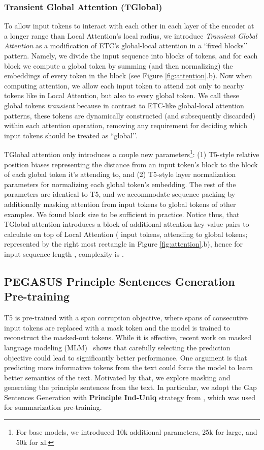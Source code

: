 \documentclass[11pt]{article}
\begin{document}
\subsubsection{Transient Global Attention (TGlobal)}
To allow input tokens to interact with each other in each layer of the encoder at a longer range than Local Attention’s local radius, we introduce {\em Transient Global Attention} as a modification of ETC’s global-local attention in a ``fixed blocks’’ pattern.  Namely, we divide the input sequence into blocks of  tokens, and for each block we compute a global token by summing (and then normalizing) the embeddings of every token in the block (see Figure \ref{fig:attention}.b).  Now when computing attention, we allow each input token to attend not only to nearby tokens like in Local Attention, but also to every global token. We call these global tokens \emph{transient} because in contrast to ETC-like global-local attention patterns, these tokens are dynamically constructed (and subsequently discarded) within each attention operation, removing any requirement for deciding which input tokens should be treated as ``global’’.

TGlobal attention only introduces a couple new parameters\footnote{For base models, we introduced 10k additional parameters, 25k for large, and 50k for xl.}: (1) T5-style relative position biases representing the distance from an input token’s block to the block of each global token it’s attending to, and (2) T5-style layer normalization parameters for normalizing each global token’s embedding.  The rest of the parameters are identical to T5, and we accommodate sequence packing by additionally masking attention from input tokens to global tokens of other examples.  We found block size  to be sufficient in practice. Notice thus, that TGlobal attention introduces a block of  additional attention key-value pairs to calculate on top of Local Attention ( input tokens, attending to  global tokens; represented by the right most rectangle in Figure \ref{fig:attention}.b), hence
for input sequence length , complexity is .







\subsection{PEGASUS Principle Sentences Generation Pre-training}
\label{sec:pegasus}
T5 is pre-trained with a span corruption objective, where spans of consecutive input tokens are replaced with a mask token and the model is trained to reconstruct the masked-out tokens.
While it is effective, recent work on masked language modeling (MLM)~\cite{liu2019roberta,zhang-etal-2019-ernie} shows that carefully selecting the prediction objective could lead to significantly better performance. 
One argument is that predicting more informative tokens from the text could force the model to learn better semantics of the text. 
Motivated by that, we explore masking and generating the principle sentences from the text.
In particular, we adopt the Gap Sentences Generation with \textbf{Principle Ind-Uniq} strategy from \citet{pegasus}, which was used for summarization pre-training.
\end{document}
